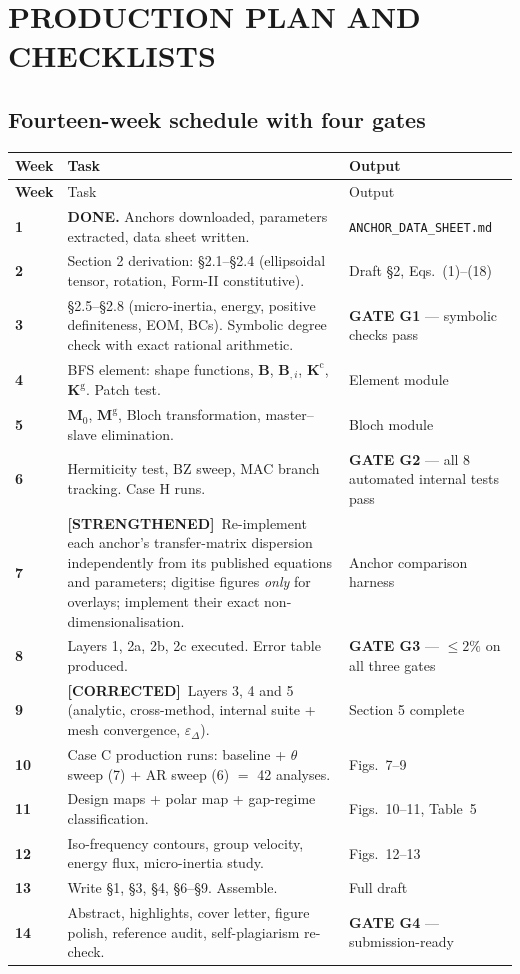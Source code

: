 \documentclass[11pt,a4paper]{article}
\newcommand{\STR}{{\color{strcol}\textbf{[STRENGTHENED]}}}
\newcommand{\COR}{{\color{corcol}\textbf{[CORRECTED]}}}
\begin{document}
\newpage
\section{PRODUCTION PLAN AND CHECKLISTS}

\subsection{Fourteen-week schedule with four gates}

\begin{longtable}{@{}>{\bfseries}p{1.5cm} L{8.2cm} L{4.6cm}@{}}
\toprule
Week & Task & Output \\
\midrule
\endfirsthead
\toprule
Week & Task & Output \\
\midrule
{} & \textbf{DONE.} Anchors downloaded, parameters extracted, data sheet written. & \texttt{ANCHOR\_DATA\_SHEET.md} \\
2 & Section 2 derivation: \S2.1--\S2.4 (ellipsoidal tensor, rotation, Form-II constitutive). & Draft \S2, Eqs.\ (1)--(18) \\
3 & \S2.5--\S2.8 (micro-inertia, energy, positive definiteness, EOM, BCs). Symbolic degree check with exact rational arithmetic. & \textbf{GATE G1} --- symbolic checks pass \\
4 & BFS element: shape functions, $\bm B$, $\bm B_{,i}$, $\bm K^{\mathrm c}$, $\bm K^{\mathrm g}$. Patch test. & Element module \\
5 & $\bm M_0$, $\bm M^{\mathrm g}$, Bloch transformation, master--slave elimination. & Bloch module \\
6 & Hermiticity test, BZ sweep, MAC branch tracking. Case H runs. & \textbf{GATE G2} --- all 8 automated internal tests pass \\
7 & \STR\ Re-implement each anchor's transfer-matrix dispersion independently from its published equations and parameters; digitise figures \emph{only} for overlays; implement their exact non-dimensionalisation. & Anchor comparison harness \\
8 & Layers 1, 2a, 2b, 2c executed. Error table produced. & \textbf{GATE G3} --- $\le2\%$ on all three gates \\
9 & \COR\ Layers 3, 4 and 5 (analytic, cross-method, internal suite + mesh convergence, $\varepsilon_\Delta$). & Section 5 complete \\
10 & Case C production runs: baseline + $\theta$ sweep (7) + AR sweep (6) $=$ 42 analyses. & Figs.~7--9 \\
11 & Design maps + polar map + gap-regime classification. & Figs.~10--11, Table~5 \\
12 & Iso-frequency contours, group velocity, energy flux, micro-inertia study. & Figs.~12--13 \\
13 & Write \S1, \S3, \S4, \S6--\S9. Assemble. & Full draft \\
14 & Abstract, highlights, cover letter, figure polish, reference audit, self-plagiarism re-check. & \textbf{GATE G4} --- submission-ready \\
\bottomrule
\end{longtable}
\end{document}
